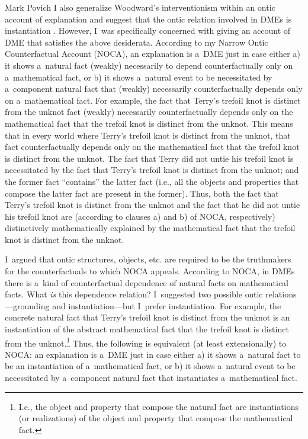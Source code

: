 \begin{artengenv}{Mark Povich}
I also generalize Woodward’s interventionism within an ontic account of explanation and suggest that the ontic relation involved in DMEs is instantiation
\parencites[][]{povich_minimal_2018}[][]{povich_narrow_2021}. %
 However, I~was specifically concerned with giving an account of DME that satisfies the above desiderata. According to my Narrow Ontic Counterfactual Account (NOCA), an explanation is a~DME just in case either a) it shows a~natural fact (weakly) necessarily to depend counterfactually only on a~mathematical fact, or b) it shows a~natural event to be necessitated by a~component natural fact that (weakly) necessarily counterfactually depends only on a~mathematical fact. For example, the fact that Terry's trefoil knot is distinct from the unknot fact (weakly) necessarily counterfactually depends only on the mathematical fact that the trefoil knot is distinct from the unknot. This means that in every world where Terry's trefoil knot is distinct from the unknot, that fact counterfactually depends only on the mathematical fact that the trefoil knot is distinct from the unknot. The fact that Terry did not untie his trefoil knot is necessitated by the fact that Terry's trefoil knot is distinct from the unknot; and the former fact ``contains'' the latter fact (i.e., all the objects and properties that compose the latter fact are present in the former). Thus, both the fact that Terry's trefoil knot is distinct from the unknot and the fact that he did not untie his trefoil knot are (according to clauses a) and b) of NOCA, respectively) distinctively mathematically explained by the mathematical fact that the trefoil knot is distinct from the unknot.

I~argued that ontic structures, objects, etc. are required to be the truthmakers for the counterfactuals to which NOCA appeals. According to NOCA, in DMEs there is a~kind of counterfactual dependence of natural facts on mathematical facts. What \textit{is} this dependence relation? I~suggested two possible ontic relations---grounding and instantiation---but I~prefer instantiation. For example, the concrete natural fact that Terry's trefoil knot is distinct from the unknot is an instantiation of the abstract mathematical fact that the trefoil knot is distinct from the unknot.\footnote{I.e., the object and property that compose the natural fact are instantiations (or realizations) of the object and property that compose the mathematical fact.} Thus, the following is equivalent (at least extensionally) to NOCA: an explanation is a~DME just in case either a) it shows a~natural fact to be an instantiation of a~mathematical fact, or b) it shows a~natural event to be necessitated by a~component natural fact that instantiates a~mathematical fact.


\end{artengenv}
